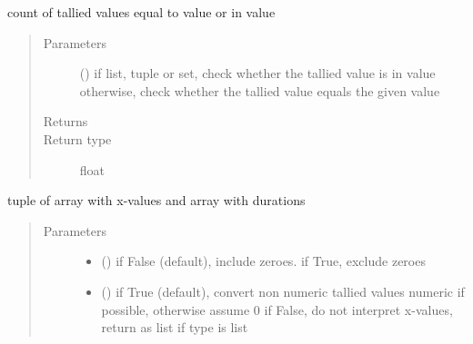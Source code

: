 \documentclass[letterpaper,10pt,english]{sphinxmanual}
\begin{document}
\begin{fulllineitems}

\begin{fulllineitems}
\label{\detokenize{Reference:salabim.MonitorTimestamp.value_number_of_entries}}
count of tallied values equal to value or in value
\begin{quote}\begin{description}
\item[{Parameters}] \leavevmode
{} () \textendash{} if list, tuple or set, check whether the tallied value is in value 
otherwise, check whether the tallied value equals the given value

\item[{Returns}] \leavevmode
{}

\item[{Return type}] \leavevmode
float

\end{description}\end{quote}

\end{fulllineitems}


\begin{fulllineitems}
\label{\detokenize{Reference:salabim.MonitorTimestamp.xduration}}
tuple of array with x-values and array with durations
\begin{quote}\begin{description}
\item[{Parameters}] \leavevmode\begin{itemize}
\item {} 
 () \textendash{} if False (default), include zeroes. if True, exclude zeroes

\item {} 
 () \textendash{} if True (default), convert non numeric tallied values numeric if possible, otherwise assume 0 
if False, do not interpret x-values, return as list if type is list


\end{itemize}
\end{description}
\end{quote}
\end{fulllineitems}
\end{fulllineitems}
\end{document}
